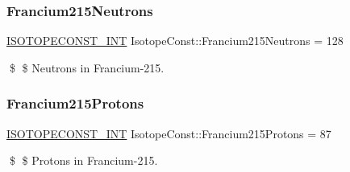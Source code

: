 \subsubsection{\texorpdfstring{Francium215\+Neutrons}{Francium215Neutrons}}
{\footnotesize\ttfamily \mbox{\hyperlink{group___isotope_const-_macros_ga5f18360b3e99483a35c32d789e62621c}{I\+S\+O\+T\+O\+P\+E\+C\+O\+N\+S\+T\+\_\+\+I\+NT}} Isotope\+Const\+::\+Francium215\+Neutrons = 128}

\$ \$ Neutrons in Francium-\/215. \mbox{\label{group___isotope_const-_francium-_fr215_ga1263c4223ecf5b92d8d59382d9f86129}} 
\subsubsection{\texorpdfstring{Francium215\+Protons}{Francium215Protons}}
{\footnotesize\ttfamily \mbox{\hyperlink{group___isotope_const-_macros_ga5f18360b3e99483a35c32d789e62621c}{I\+S\+O\+T\+O\+P\+E\+C\+O\+N\+S\+T\+\_\+\+I\+NT}} Isotope\+Const\+::\+Francium215\+Protons = 87}

\$ \$ Protons in Francium-\/215. 